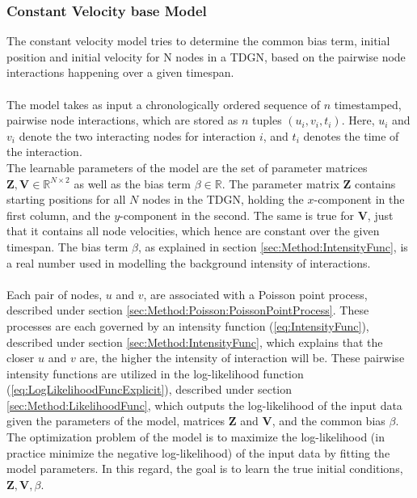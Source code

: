 \subsubsection{Constant Velocity base Model}
\label{sec:Method:ProposedModel:ConstantVelocityModel}
The constant velocity model tries to determine the common bias term, initial position and initial velocity for N nodes in a TDGN, based on the pairwise node interactions happening over a given timespan.
\\\\
The model takes as input a chronologically ordered sequence of $n$ timestamped, pairwise node interactions, which are stored as $n$ tuples $(u_i, v_i, t_i)$.
Here, $u_i$ and $v_i$ denote the two interacting nodes for interaction $i$, and $t_i$ denotes the time of the interaction.
\\
The learnable parameters of the model are the set of parameter matrices $\textbf{Z}, \textbf{V} \in \mathbb{R} ^{N \times 2}$ as well as the bias term $\beta \in \mathbb{R}$.
The parameter matrix $\textbf{Z}$ contains starting positions for all $N$ nodes in the TDGN, holding the $x$-component in the first column, and the $y$-component in the second.
The same is true for $\textbf{V}$, just that it contains all node velocities, which hence are constant over the given timespan.
The bias term $\beta$, as explained in section \ref{sec:Method:IntensityFunc}, is a real number used in modelling the background intensity of interactions.
\\\\
Each pair of nodes, $u$ and $v$, are associated with a Poisson point process, described under section \ref{sec:Method:Poisson:PoissonPointProcess}.
These processes are each governed by an intensity function (\ref{eq:IntensityFunc}), described under section \ref{sec:Method:IntensityFunc}, which explains that the closer $u$ and $v$ are, the higher the intensity of interaction will be. 
These pairwise intensity functions are utilized in the log-likelihood function (\ref{eq:LogLikelihoodFuncExplicit}), described under section \ref{sec:Method:LikelihoodFunc}, which outputs the log-likelihood of the input data given the parameters of the model, matrices $\textbf{Z}$ and $\textbf{V}$, and the common bias $\beta$.
\\
The optimization problem of the model is to maximize the log-likelihood (in practice minimize the negative log-likelihood) of the input data by fitting the model parameters.
In this regard, the goal is to learn the true initial conditions, $\textbf{Z}, \textbf{V}, \beta$.

